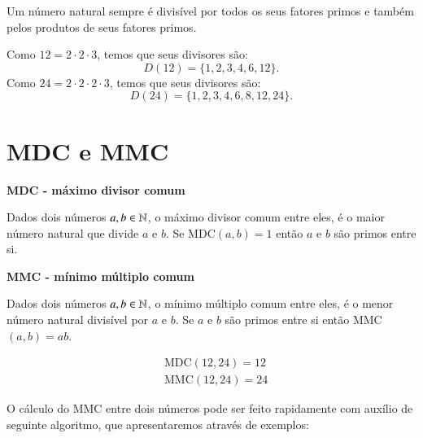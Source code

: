  \begin{obs}
 Um número natural sempre é divisível por todos os seus fatores primos e também pelos produtos de seus fatores primos.
 \end{obs}

 \begin{exem}
 Como $12= 2 \cdot 2 \cdot 3$, temos que seus divisores são: \[D(12)= \{1, 2, 3, 4, 6, 12\}.\]
 Como $24= 2 \cdot 2 \cdot 2 \cdot 3$, temos que seus divisores são: \[D(24)= \{1, 2, 3, 4, 6, 8, 12, 24\}.\]
 \end{exem}

 \section{MDC e MMC}
 
 \vskip0.3cm
 \colorbox{azul}{
 \begin{minipage}{0.9\linewidth}
 \begin{center}
  \textbf{MDC - máximo divisor comum}

  Dados dois números $a, b \in \mathbb{N}$, o máximo divisor comum entre eles, é o maior número natural que divide $a$ e $b$. Se MDC$(a, b)= 1$ então $a$ e $b$ são primos entre si.
 \end{center}
 \end{minipage}}

 \vskip0.3cm

 \colorbox{azul}{
 \begin{minipage}{0.9\linewidth}
 \begin{center}
 \textbf{MMC - mínimo múltiplo comum}

 Dados dois números $a, b \in \mathbb{N}$, o mínimo múltiplo comum entre eles, é o menor número natural divisível por $a$ e $b$. Se $a$ e $b$ são primos entre si então MMC$(a, b)= ab$.
 \end{center}
 \end{minipage}}


 \begin{exem}
 \begin{align*}
 & \text{MDC}(12, 24)= 12 \\
 & \text{MMC}(12, 24)= 24
 \end{align*}
 \end{exem}

 O cálculo do MMC entre dois números pode ser feito rapidamente com auxílio de seguinte algoritmo, que apresentaremos através de exemplos:

